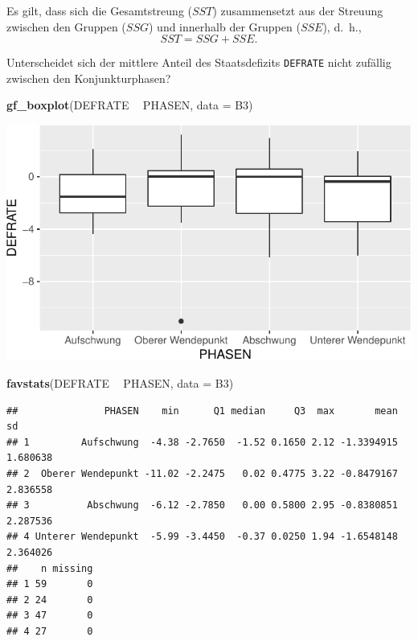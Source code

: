 \documentclass[12pt,ngerman,paper=a4,pagesize,DIV=13]{scrreprt}
\newenvironment{Shaded}{\begin{snugshade}}{\end{snugshade}}
\newcommand{\DataTypeTok}[1]{\textcolor[rgb]{0.13,0.29,0.53}{#1}}
\newcommand{\KeywordTok}[1]{\textcolor[rgb]{0.13,0.29,0.53}{\textbf{#1}}}
\newcommand{\NormalTok}[1]{#1}
\newcommand{\OperatorTok}[1]{\textcolor[rgb]{0.81,0.36,0.00}{\textbf{#1}}}
\newcommand{\StringTok}[1]{\textcolor[rgb]{0.31,0.60,0.02}{#1}}
\begin{document}
Es gilt, dass sich die Gesamtstreung (\(SST\)) zusammensetzt aus der
Streuung zwischen den Gruppen (\(SSG\)) und innerhalb der Gruppen
(\(SSE\)), d.~h., \[SST=SSG+SSE.\]

Unterscheidet sich der mittlere Anteil des Staatsdefizits
\texttt{DEFRATE} nicht zufällig zwischen den Konjunkturphasen?

\begin{Shaded}
\begin{Highlighting}[]
\KeywordTok{gf_boxplot}\NormalTok{(DEFRATE }\OperatorTok{~}\StringTok{ }\NormalTok{PHASEN, }\DataTypeTok{data =}\NormalTok{ B3)}
\end{Highlighting}
\end{Shaded}

\includegraphics{DatenerhebungStatistik-Uebung_files/figure-latex/unnamed-chunk-148-1.pdf}

\begin{Shaded}
\begin{Highlighting}[]
\KeywordTok{favstats}\NormalTok{(DEFRATE }\OperatorTok{~}\StringTok{ }\NormalTok{PHASEN, }\DataTypeTok{data =}\NormalTok{ B3)}
\end{Highlighting}
\end{Shaded}

\begin{verbatim}
##               PHASEN    min      Q1 median     Q3  max       mean       sd
## 1         Aufschwung  -4.38 -2.7650  -1.52 0.1650 2.12 -1.3394915 1.680638
## 2  Oberer Wendepunkt -11.02 -2.2475   0.02 0.4775 3.22 -0.8479167 2.836558
## 3          Abschwung  -6.12 -2.7850   0.00 0.5800 2.95 -0.8380851 2.287536
## 4 Unterer Wendepunkt  -5.99 -3.4450  -0.37 0.0250 1.94 -1.6548148 2.364026
##    n missing
## 1 59       0
## 2 24       0
## 3 47       0
## 4 27       0
\end{verbatim}
\end{document}
